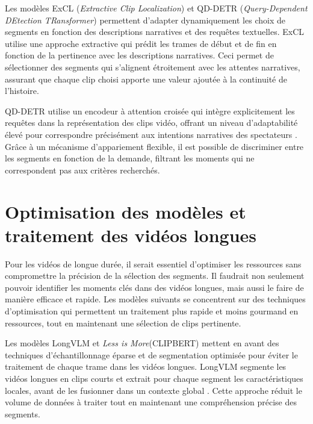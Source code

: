 Les modèles ExCL (\textit{Extractive Clip Localization}) \cite{ghosh2019_excl} et QD-DETR (\textit{Query-Dependent DEtection TRansformer}) \cite{sun2023_gptsee} permettent d’adapter dynamiquement les choix de segments en fonction des descriptions narratives et des requêtes textuelles. ExCL utilise une approche extractive qui prédit les trames de début et de fin en fonction de la pertinence avec les descriptions narratives. Ceci permet de sélectionner des segments qui s’alignent étroitement avec les attentes narratives, assurant que chaque clip choisi apporte une valeur ajoutée à la continuité de l’histoire. 

QD-DETR utilise un encodeur à attention croisée qui intègre explicitement les requêtes dans la représentation des clips vidéo, offrant un niveau d’adaptabilité élevé pour correspondre précisément aux intentions narratives des spectateurs \cite{lei2021_moments}. Grâce à un mécanisme d’appariement flexible, il est possible de discriminer entre les segments en fonction de la demande, filtrant les moments qui ne correspondent pas aux critères recherchés.

\section{Optimisation des modèles et traitement des vidéos longues}

Pour les vidéos de longue durée, il serait essentiel d’optimiser les ressources sans compromettre la précision de la sélection des segments. Il faudrait non seulement pouvoir identifier les moments clés dans des vidéos longues, mais aussi le faire de manière efficace et rapide. Les modèles suivants se concentrent sur des techniques d’optimisation qui permettent un traitement plus rapide et moins gourmand en ressources, tout en maintenant une sélection de clips pertinente. 

Les modèles LongVLM \cite{weng2024} et \textit{Less is More}(CLIPBERT) \cite{lei2021_clipbert} mettent en avant des techniques d’échantillonnage éparse et de segmentation optimisée pour éviter le traitement de chaque trame dans les vidéos longues. LongVLM segmente les vidéos longues en clips courts et extrait pour chaque segment les caractéristiques locales, avant de les fusionner dans un contexte global \cite{weng2024}. Cette approche réduit le volume de données à traiter tout en maintenant une compréhension précise des segments. 

